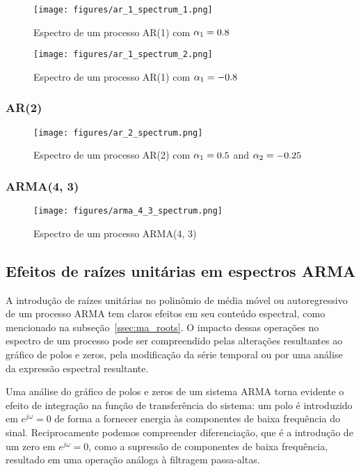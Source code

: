 \begin{figure}[H]
    \centering
    \texttt{[image: figures/ar\_1\_spectrum\_1.png]}
    \caption{Espectro de um processo AR(1) com
    $\protect \alpha_1 = 0.8$}
    \label{fig:ar_1_spectrum_1}
\end{figure}

\begin{figure}[H]
    \centering
    \texttt{[image: figures/ar\_1\_spectrum\_2.png]}
    \caption{Espectro de um processo AR(1) com
    $\protect \alpha_1 = -0.8$}
    \label{fig:ar_1_spectrum_2}
\end{figure}

\subsubsection{AR(2)}

\begin{figure}[H]
    \centering
    \texttt{[image: figures/ar\_2\_spectrum.png]}
    \caption{Espectro de um processo AR(2) com
    $\protect \alpha_1 = 0.5$ and $\protect \alpha_2 = -0.25$}
    \label{fig:ar_2_spectrum}
\end{figure}

\subsubsection{ARMA(4, 3)}

\begin{figure}[H]
    \centering
    \texttt{[image: figures/arma\_4\_3\_spectrum.png]}
    \caption{Espectro de um processo ARMA(4, 3)}
    \label{fig:ar_4_3_spectrum}
\end{figure}


\subsection{Efeitos de raízes unitárias em espectros ARMA}

A introdução de raízes unitárias no polinômio de média móvel ou autoregressivo
de um processo ARMA tem claros efeitos em seu conteúdo espectral, como
mencionado na subseção~\ref{ssec:ma_roots}. O impacto dessas operações no
espectro de um processo pode ser compreendido pelas alterações resultantes ao
gráfico de polos e zeros, pela modificação da série temporal ou por uma análise
da expressão espectral resultante.

Uma análise do gráfico de polos e zeros de um sistema ARMA torna evidente o
efeito de integração na função de transferência do sistema: um polo é
introduzido em $e^{j\omega}=0$ de forma a fornecer energia às componentes de
baixa frequência do sinal. Reciprocamente podemos compreender diferenciação,
que é a introdução de um zero em $e^{j\omega}=0$, como a supressão de
componentes de baixa frequência, resultado em uma operação análoga à filtragem
passa-altas.

